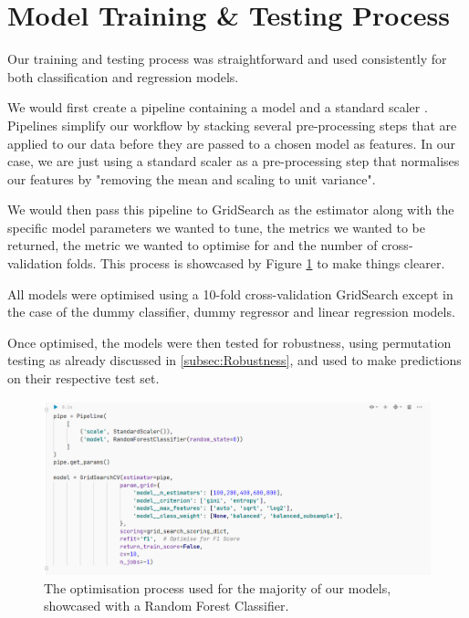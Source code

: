 \section{Model Training \& Testing Process}

Our training and testing process was straightforward and used consistently for both classification and regression models.

We would first create a pipeline \citep{Pipeline} containing a model and a standard scaler \citep{StandardScaler}. Pipelines simplify our workflow by stacking several pre-processing steps that are applied to our data before they are passed to a chosen model as features. In our case, we are just using a standard scaler as a pre-processing step that normalises our features by "removing the mean and scaling to unit variance".

We would then pass this pipeline to GridSearch \citep{GridSearch} as the estimator along with the specific model parameters we wanted to tune, the metrics we wanted to be returned, the metric we wanted to optimise for and the number of cross-validation folds. This process is showcased by Figure \ref{fig:Optimisation} to make things clearer.

All models were optimised using a 10-fold cross-validation GridSearch except in the case of the dummy classifier, dummy regressor and linear regression models.

Once optimised, the models were then tested for robustness, using permutation testing as already discussed in \ref{subsec:Robustness}, and used to make predictions on their respective test set.

\begin{figure}[htb]
    \centering
    \includegraphics[width=1.0\linewidth]{images/Optimisation.pdf}    
    \caption{The optimisation process used for the majority of our models, showcased with a Random Forest Classifier.}

    \label{fig:Optimisation} 
\end{figure}

